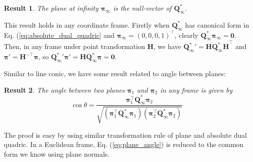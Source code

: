 \documentclass[12pt]{article}
\newtheorem{result}{Result}[section]
\numberwithin{equation}{section}
\begin{document}
\begin{result}
The plane at infinity $\bm{\pi}_{\infty}$ is the null-vector of $\mathbf{Q}_{\infty}^*$.
\end{result}

This result holds in any coordinate frame. Firstly when $\mathbf{Q}_{\infty}^*$ has canonical form in Eq. (\ref{eq:absolute_dual_quadric} and $\bm{\pi}_{\infty} = (0, 0, 0, 1)^\top$, clearly $\mathbf{Q}_{\infty}^* \bm{\pi}_{\infty} = \mathbf{0}$. Then, in any frame under point transformation $\mathbf{H}$, we have ${\mathbf{Q}_{\infty}^*}' = \mathbf{H}\mathbf{Q_{\infty}^* H}^{\top}$ and $\bm{\pi}' =  \mathbf{H}^{-\top}\bm{\pi}$, so ${\mathbf{Q}_{\infty}^*}' \bm{\pi}' = \mathbf{H}\mathbf{Q_{\infty}^*} \bm{\pi} = \mathbf{0}$.

Similar to line conic, we have some result related to angle between planes: \\
\begin{result}
The angle between two planes $\bm{\pi}_1$ and $\bm{\pi}_2$ in any frame is given by
\begin{equation}
\cos \theta = \frac{\bm{\pi}_1^\top\mathbf{Q}_{\infty}^* \bm{\pi}_2}{\sqrt{(\bm{\pi}_1^\top\mathbf{Q}_{\infty}^* \bm{\pi}_1)(\bm{\pi}_2^\top\mathbf{Q}_{\infty}^* \bm{\pi}_2)}}
\label{eq:plane_angle}
\end{equation}
\end{result}
The proof is easy by using similar transformation rule of plane and absolute dual quadric. In a Euclidean frame, Eq. (\ref{eq:plane_angle}) is reduced to the common form we know using plane normals. 

\newpage



\end{document}
